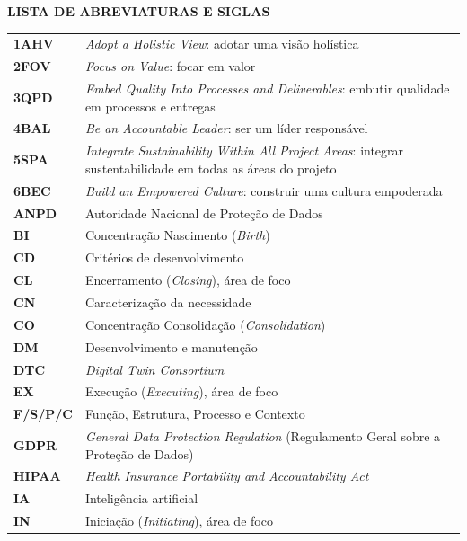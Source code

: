 \documentclass[12pt,a4paper,article,oneside,english,brazil]{abntex2}
\begin{document}
\begingroup
\SingleSpacing
\begin{center}\textbf{LISTA DE ABREVIATURAS E SIGLAS}\end{center}
\small
\begin{longtable}{@{}>{\raggedright\arraybackslash}p{2.6cm}>{\raggedright\arraybackslash}p{\dimexpr\linewidth-2.6cm-2\tabcolsep\relax}@{}}
\textbf{1AHV} & \textit{Adopt a Holistic View}: adotar uma visão holística\\[2pt]
\textbf{2FOV} & \textit{Focus on Value}: focar em valor\\[2pt]
\textbf{3QPD} & \textit{Embed Quality Into Processes and Deliverables}: embutir qualidade em processos e entregas\\[2pt]
\textbf{4BAL} & \textit{Be an Accountable Leader}: ser um líder responsável\\[2pt]
\textbf{5SPA} & \textit{Integrate Sustainability Within All Project Areas}: integrar sustentabilidade em todas as áreas do projeto\\[2pt]
\textbf{6BEC} & \textit{Build an Empowered Culture}: construir uma cultura empoderada\\[2pt]
\textbf{ANPD} & Autoridade Nacional de Proteção de Dados\\[2pt]
\textbf{BI} & Concentração Nascimento (\textit{Birth})\\[2pt]
\textbf{CD} & Critérios de desenvolvimento\\[2pt]
\textbf{CL} & Encerramento (\textit{Closing}), área de foco\\[2pt]
\textbf{CN} & Caracterização da necessidade\\[2pt]
\textbf{CO} & Concentração Consolidação (\textit{Consolidation})\\[2pt]
\textbf{DM} & Desenvolvimento e manutenção\\[2pt]
\textbf{DTC} & \textit{Digital Twin Consortium}\\[2pt]
\textbf{EX} & Execução (\textit{Executing}), área de foco\\[2pt]
\textbf{F/S/P/C} & Função, Estrutura, Processo e Contexto\\[2pt]
\textbf{GDPR} & \textit{General Data Protection Regulation} (Regulamento Geral sobre a Proteção de Dados)\\[2pt]
\textbf{HIPAA} & \textit{Health Insurance Portability and Accountability Act}\\[2pt]
\textbf{IA} & Inteligência artificial\\[2pt]
\textbf{IN} & Iniciação (\textit{Initiating}), área de foco\\[2pt]

\end{longtable}
\end{document}
